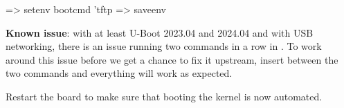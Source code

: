 \begin{ubootinput}
=> setenv bootcmd 'tftp %
=> saveenv
\end{ubootinput}

{{\bf Known issue}: with at least U-Boot 2023.04 and 2024.04 and with
USB networking, there is an issue running two  commands in a
row in . To work around this issue before we get a chance
to fix it upstream, insert  between the two 
commands and everything will work as expected.}{}

Restart the board to make sure that booting the kernel is now automated.
